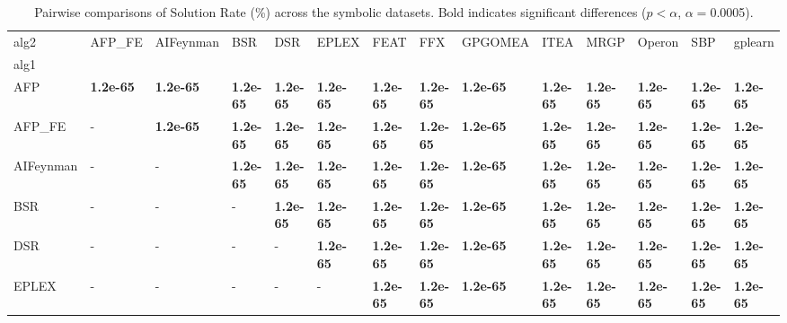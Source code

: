 \begin{table}
\centering
\tiny
\caption{Pairwise comparisons of Solution Rate (\%) across the symbolic datasets. Bold indicates significant differences ($p<\alpha$, $\alpha=$0.0005).}
\begin{tabular}{llllllllllllll}
\toprule
alg2 &           AFP\_FE &        AIFeynman &              BSR &              DSR &            EPLEX &             FEAT &              FFX &          GPGOMEA &             ITEA &             MRGP &           Operon &              SBP &          gplearn \\
alg1      &                  &                  &                  &                  &                  &                  &                  &                  &                  &                  &                  &                  &                  \\
\midrule
AFP       &  \textbf{1.2e-65} &  \textbf{1.2e-65} &  \textbf{1.2e-65} &  \textbf{1.2e-65} &  \textbf{1.2e-65} &  \textbf{1.2e-65} &  \textbf{1.2e-65} &  \textbf{1.2e-65} &  \textbf{1.2e-65} &  \textbf{1.2e-65} &  \textbf{1.2e-65} &  \textbf{1.2e-65} &  \textbf{1.2e-65} \\
AFP\_FE    &                - &  \textbf{1.2e-65} &  \textbf{1.2e-65} &  \textbf{1.2e-65} &  \textbf{1.2e-65} &  \textbf{1.2e-65} &  \textbf{1.2e-65} &  \textbf{1.2e-65} &  \textbf{1.2e-65} &  \textbf{1.2e-65} &  \textbf{1.2e-65} &  \textbf{1.2e-65} &  \textbf{1.2e-65} \\
AIFeynman &                - &                - &  \textbf{1.2e-65} &  \textbf{1.2e-65} &  \textbf{1.2e-65} &  \textbf{1.2e-65} &  \textbf{1.2e-65} &  \textbf{1.2e-65} &  \textbf{1.2e-65} &  \textbf{1.2e-65} &  \textbf{1.2e-65} &  \textbf{1.2e-65} &  \textbf{1.2e-65} \\
BSR       &                - &                - &                - &  \textbf{1.2e-65} &  \textbf{1.2e-65} &  \textbf{1.2e-65} &  \textbf{1.2e-65} &  \textbf{1.2e-65} &  \textbf{1.2e-65} &  \textbf{1.2e-65} &  \textbf{1.2e-65} &  \textbf{1.2e-65} &  \textbf{1.2e-65} \\
DSR       &                - &                - &                - &                - &  \textbf{1.2e-65} &  \textbf{1.2e-65} &  \textbf{1.2e-65} &  \textbf{1.2e-65} &  \textbf{1.2e-65} &  \textbf{1.2e-65} &  \textbf{1.2e-65} &  \textbf{1.2e-65} &  \textbf{1.2e-65} \\
EPLEX     &                - &                - &                - &                - &                - &  \textbf{1.2e-65} &  \textbf{1.2e-65} &  \textbf{1.2e-65} &  \textbf{1.2e-65} &  \textbf{1.2e-65} &  \textbf{1.2e-65} &  \textbf{1.2e-65} &  \textbf{1.2e-65} \\

\end{tabular}
\end{table}
